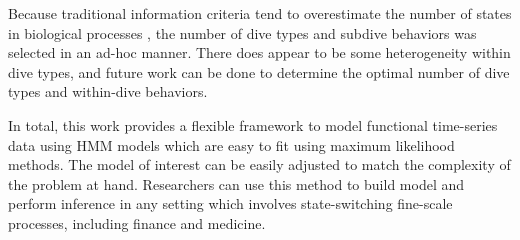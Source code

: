 
Because traditional information criteria tend to overestimate the number of states in biological processes \citep{Pohle:2017}, the number of dive types and subdive behaviors was selected in an ad-hoc manner. There does appear to be some heterogeneity within dive types, and future work can be done to determine the optimal number of dive types and within-dive behaviors.

In total, this work provides a flexible framework to model functional time-series data using HMM models which are easy to fit using maximum likelihood methods. The model of interest can be easily adjusted to match the complexity of the problem at hand. Researchers can use this method to build model and perform inference in any setting which involves state-switching fine-scale processes, including finance and medicine. 
